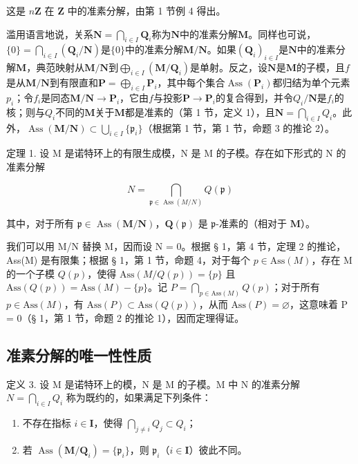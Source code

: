 这是 \(n\mathbf{Z}\) 在 \(\mathbf{Z}\) 中的准素分解，由第 1 节例 4 得出。

滥用语言地说，关系\(\mathbf{N} = \bigcap_{i \in I} \mathbf{Q}_i\)称为\(\mathbf{N}\)中的准素分解\(\mathbf{M}\)。同样也可说，\(\{0\} = \bigcap_{i \in I} (\mathbf{Q}_i / \mathbf{N})\)是\(\{0\}\)中的准素分解\(\mathbf{M} / \mathbf{N}\)。如果\((\mathbf{Q}_i)_{i \in I}\)是\(\mathbf{N}\)中的准素分解\(\mathbf{M}\)，典范映射从\(\mathbf{M} / \mathbf{N}\)到\(\bigoplus_{i \in I} (\mathbf{M} / \mathbf{Q}_i)\)是单射。反之，设\(\mathbf{N}\)是\(\mathbf{M}\)的子模，且\(f\)是从\(\mathbf{M} / \mathbf{N}\)到有限直和\(\mathbf{P} = \bigoplus_{i \in I} \mathbf{P}_i\)，其中每个集合\(\operatorname{Ass}(\mathbf{P}_i)\)都归结为单个元素\(p_i\)；令\(f_i\)是同态\(\mathbf{M} / \mathbf{N} \to \mathbf{P}_i\)，它由\(f\)与投影\(\mathbf{P} \to \mathbf{P}_i\)的复合得到，并令\(Q_i / \mathbf{N}\)是\(f_i\)的核；则与\(Q_i\)不同的\(\mathbf{M}\)关于\(\mathbf{M}\)都是准素的（第 1 节，定义 1），且\(\mathbf{N} = \bigcap_{i \in I} Q_i\)。此外，\(\operatorname{Ass}(\mathbf{M} / \mathbf{N}) \subset \bigcup_{i \in I} \{\mathfrak{p}_i\}\)（根据第 1 节，第 1 节，命题 3 的推论 2）。

定理 1. 设 M 是诺特环上的有限生成模，N 是 M 的子模。存在如下形式的 N 的准素分解

\[
N = \bigcap_ {\mathfrak {p} \in \operatorname{Ass} (M / N)} Q (\mathfrak {p})\tag{1}
\]

其中，对于所有 \(\mathfrak{p} \in \operatorname{Ass}(\mathbf{M} / \mathbf{N})\)，\(\mathbf{Q}(\mathfrak{p})\) 是 \(\mathfrak{p}\)-准素的（相对于 \(\mathbf{M}\)）。

我们可以用 M/N 替换 M，因而设 N = 0。根据 § 1，第 4 节，定理 2 的推论，Ass(M) 是有限集；根据 § 1，第 1 节，命题 4，对于每个 \(p \in \text{Ass}(M)\)，存在 M 的一个子模 \(Q(p)\)，使得 \(\text{Ass}(M/Q(p)) = \{p\}\) 且 \(\text{Ass}(Q(p)) = \text{Ass}(M) - \{p\}\)。记 \(P = \bigcap_{p \in \text{Ass}(M)} Q(p)\)；对于所有 \(p \in \text{Ass}(M)\)，有 \(\text{Ass}(P) \subset \text{Ass}(Q(p))\)，从而 \(\text{Ass}(P) = \varnothing\)，这意味着 P = 0（§ 1，第 1 节，命题 2 的推论 1），因而定理得证。

\subsection{准素分解的唯一性性质}

定义 3. 设 M 是诺特环上的模，N 是 M 的子模。M 中 N 的准素分解 \(N = \bigcap_{i \in I} Q_i\) 称为既约的，如果满足下列条件：

\begin{enumerate}
\def\labelenumi{(\alph{enumi})}
\item
  不存在指标 \(i \in \mathbf{I}\)，使得 \(\bigcap_{j \neq i} Q_j \subset Q_i\)；
\item
  若 \(\operatorname{Ass}(\mathbf{M} / \mathbf{Q}_i) = \{\mathfrak{p}_i\}\)，则 \(\mathfrak{p}_i\)（\(i \in \mathbf{I}\)）彼此不同。
\end{enumerate}

